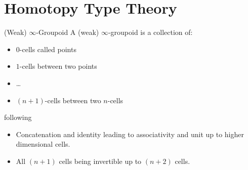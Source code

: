 \documentclass[10pt, aspectratio=43]{beamer}
\newcommand{\0}{\mathbf{0}}
\newcommand{\1}{\mathbf{1}}
\newcommand{\2}{\mathbf{2}}
\newcommand{\N}{\mathbb{N}}
\begin{document}
\section{Homotopy Type Theory}

\begin{frame}{(Weak) $\infty$-Groupoid}
  A (weak) $\infty$-groupoid is a collection of:
  \begin{itemize}
    \item $0$-cells called points
    \item $1$-cells between two points
    \item \ldots
    \item $(n+1)$-cells between two $n$-cells
  \end{itemize}
  following
  \begin{itemize}
    \item Concatenation and identity leading to associativity and unit up to higher dimensional cells. 
    \item All $(n+1)$ cells being invertible up to $(n+2)$ cells.
  \end{itemize}
\end{frame}
%
%
%
\end{document}
